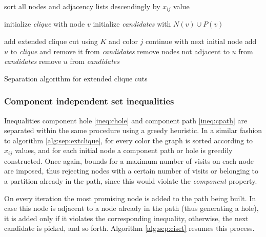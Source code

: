 \begin{algorithm}
\label{alg:sep:extclique}

\begin{algorithmic}

\STATE sort all nodes and adjacency lists descendingly by $x_{ij}$ value
 
	\STATE initialize \textit{clique} with node $v$
	\STATE initialize \textit{candidates} with $N(v) \cup P(v)$

				\STATE add extended clique cut using $K$ and color $j$ 
			\ENDFOR
			\STATE continue with next initial node
			\STATE add $u$ to \textit{clique} and remove it from \textit{candidates} 
			\STATE remove nodes not adjacent to $u$ from \textit{candidates} 
		\ELSE
			\STATE remove $u$ from \textit{candidates}
		\ENDIF
	\ENDWHILE
		
\ENDFOR
\ENDFOR

\caption{Separation algorithm for extended clique cuts}

\end{algorithmic}
\end{algorithm} 

\subsubsection*{Component independent set inequalities}

Inequalities component hole \ref{ineq:chole} and component path \ref{ineq:cpath} are separated within the same procedure using a greedy heuristic. In a similar fashion to algorithm \ref{alg:sep:extclique}, for every color the graph is sorted according to $x_{ij}$ values, and for each initial node a component path or hole is greedily constructed. Once again, bounds for a maximum number of visits on each node are imposed, thus rejecting nodes with a certain number of visits or belonging to a partition already in the path, since this would violate the \textit{component} property.

On every iteration the most promising node is added to the path being built. In case this node is adjacent to a node already in the path (thus generating a hole), it is added only if it violates the corresponding inequality, otherwise, the next candidate is picked, and so forth. Algorithm \ref{alg:sep:ciset} resumes this process.

